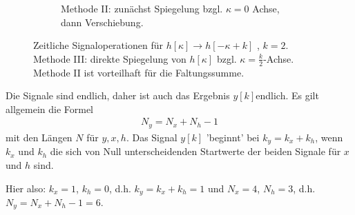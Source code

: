 \begin{figure*}[h]
\begin{subfigure}{0.7\textwidth}
\caption{Methode II: zunächst Spiegelung bzgl. $\kappa=0$ Achse, dann Verschiebung.}
\label{fig:FD58EEB1EC_MethodII}
\end{subfigure}
%
\caption{Zeitliche Signaloperationen für $h[\kappa] \rightarrow h[-\kappa+k]$ , $k=2$.
Methode III: direkte Spiegelung von $h[\kappa]$ bzgl. $\kappa=\frac{k}{2}$-Achse.
Methode II ist vorteilhaft für die Faltungssumme.}
\label{fig:FD58EEB1EC_Methods}
\end{figure*}
%
%
%
\begin{Ansatz}
Die Signale sind endlich, daher ist auch das Ergebnis $y[k]$endlich.
Es gilt allgemein die Formel
\begin{align}
N_y = N_x + N_h-1
\end{align}
mit den Längen $N$ für $y,x,h$.
Das Signal $y[k]$ 'beginnt' bei $k_y=k_x+k_h$, wenn $k_x$ und $k_h$ die
sich von Null unterscheidenden Startwerte
der beiden Signale für $x$ und $h$ sind.

Hier also: $k_x=1$, $k_h = 0$, d.h. $k_y=k_x+k_h = 1$ und
$N_x = 4$, $N_h=3$, d.h. $N_y = N_x+N_h-1 = 6$.

\end{Ansatz}
